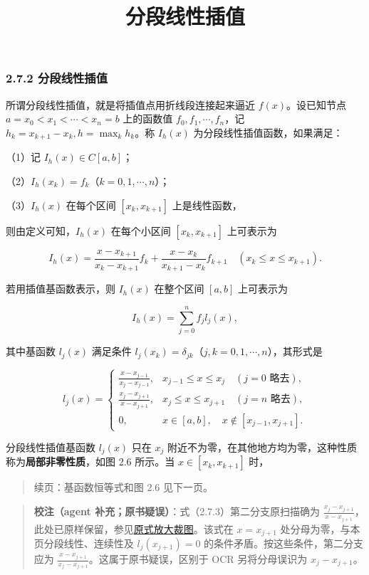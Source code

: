 \documentclass[
  10pt,
  fontset=fandol]{ctexart}
\title{分段线性插值}
\author{}
\date{}
\begin{document}
\maketitle

\subsubsection{2.7.2 分段线性插值}\label{ux5206ux6bb5ux7ebfux6027ux63d2ux503c}

所谓分段线性插值，就是将插值点用折线段连接起来逼近 \(f(x)\)。设已知节点 \(a=x_0<x_1<\cdots<x_n=b\) 上的函数值 \(f_0,f_1,\cdots,f_n\)，记 \(h_k=x_{k+1}-x_k,h=\max_k h_k\)。称 \(I_h(x)\) 为分段线性插值函数，如果满足：

（1）记 \(I_h(x)\in C[a,b]\)；

（2）\(I_h(x_k)=f_k\)（\(k=0,1,\cdots,n\)）；

（3）\(I_h(x)\) 在每个区间 \([x_k,x_{k+1}]\) 上是线性函数，

则由定义可知，\(I_h(x)\) 在每个小区间 \([x_k,x_{k+1}]\) 上可表示为

\[I_h(x)=\frac{x-x_{k+1}}{x_k-x_{k+1}}f_k+\frac{x-x_k}{x_{k+1}-x_k}f_{k+1}\quad(x_k\leqslant x\leqslant x_{k+1}).\tag{2.7.1}\]

若用插值基函数表示，则 \(I_h(x)\) 在整个区间 \([a,b]\) 上可表示为

\[I_h(x)=\sum_{j=0}^n f_jl_j(x),\tag{2.7.2}\]

其中基函数 \(l_j(x)\) 满足条件 \(l_j(x_k)=\delta_{jk}\)（\(j,k=0,1,\cdots,n\)），其形式是

\[l_j(x)=\begin{cases}
\displaystyle\frac{x-x_{j-1}}{x_j-x_{j-1}},&x_{j-1}\leqslant x\leqslant x_j\quad(j=0\text{ 略去}),\\[6pt]
\displaystyle\frac{x_j-x_{j+1}}{x-x_{j+1}},&x_j\leqslant x\leqslant x_{j+1}\quad(j=n\text{ 略去}),\\[6pt]
0,&x\in[a,b],\quad x\notin[x_{j-1},x_{j+1}].
\end{cases}\tag{2.7.3}\]

分段线性插值基函数 \(l_j(x)\) 只在 \(x_j\) 附近不为零，在其他地方均为零，这种性质称为\textbf{局部非零性质}，如图 2.6 所示。当 \(x\in[x_k,x_{k+1}]\) 时，

\begin{quote}
续页：基函数恒等式和图 2.6 见下一页。
\end{quote}

\begin{quote}
\textbf{校注（agent 补充；原书疑误）}：式（2.7.3）第二分支原扫描确为 \(\frac{x_j-x_{j+1}}{x-x_{j+1}}\)，此处已原样保留，参见\href{../assets/ch02b/pdf-046-eq-2-7-3-detail.png}{原式放大裁图}。该式在 \(x=x_{j+1}\) 处分母为零，与本页分段线性、连续性及 \(l_j(x_{j+1})=0\) 的条件矛盾。按这些条件，第二分支应为 \(\frac{x-x_{j+1}}{x_j-x_{j+1}}\)。这属于原书疑误，区别于 OCR 另将分母误识为 \(x_j-x_{j+1}\)。
\end{quote}
\end{document}
